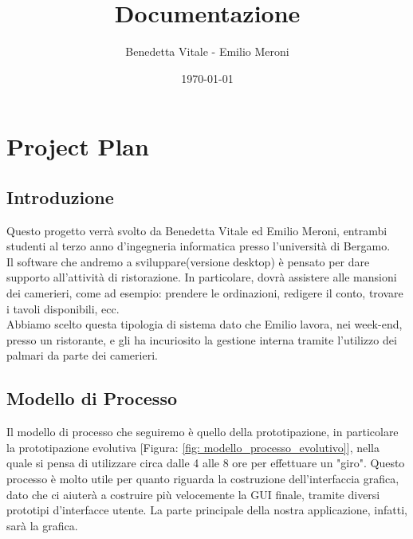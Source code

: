\documentclass[12pt, letterpaper]{book}
\title{Documentazione}
\author{Benedetta Vitale - Emilio Meroni}
\date{\today}
\begin{document}
\maketitle

\tableofcontents

\chapter{Project Plan}

\section{Introduzione}

Questo progetto verrà svolto da Benedetta Vitale ed Emilio Meroni, entrambi studenti al terzo anno d'ingegneria informatica presso l'università di Bergamo.\\

Il software che andremo a sviluppare(versione desktop) è pensato per dare supporto
all'attività di ristorazione. In particolare, dovrà assistere alle mansioni dei camerieri, come ad esempio: prendere le ordinazioni, redigere il conto, trovare i tavoli disponibili, ecc.\\

Abbiamo scelto questa tipologia di sistema dato che Emilio lavora, nei week-end, presso un ristorante, e gli ha incuriosito la gestione interna tramite l'utilizzo dei palmari da parte dei camerieri.
\begin{tabbing}

\end{tabbing}

\section{Modello di Processo}

Il modello di processo che seguiremo è quello della prototipazione, in particolare la prototipazione evolutiva [Figura: \ref{fig: modello_processo_evolutivo}], nella quale si pensa di utilizzare circa dalle 4 alle 8 ore per effettuare un "giro". Questo processo è molto utile per quanto riguarda la costruzione dell'interfaccia grafica, dato che ci aiuterà a costruire più velocemente la GUI finale, tramite diversi prototipi d'interfacce utente. La parte principale della nostra applicazione, infatti, sarà la grafica.
\end{document}
